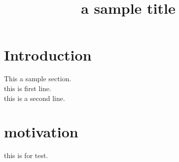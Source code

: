 \documentclass[12pt]{article}
\begin{document}
\title{a sample title}
\maketitle

\section{Introduction}
This a sample section.\\
this is first line.\\
this is a second line.

\section{motivation}
this is for test.

\begin{tabular}{rr}

\end{tabular}
\end{document}

